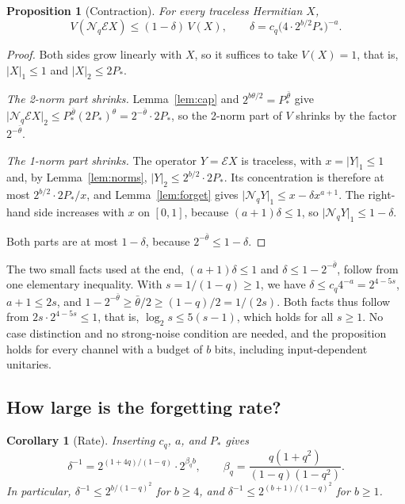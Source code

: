 \documentclass[aps,prl,twocolumn,superscriptaddress,floatfix]{revtex4-2}
\theoremstyle{plain}
\newtheorem{proposition}[lemma]{Proposition}
\newtheorem{corollary}[lemma]{Corollary}
\newcommand{\nrm}[2]{\lvert #1\rvert_{#2}}
\newcommand{\cE}{\mathcal E}
\newcommand{\Nq}{\mathcal N_q}
\begin{document}
\begin{proposition}[Contraction]\label{prop:contraction}
For every traceless Hermitian $X$,
\begin{equation}
V(\Nq\cE X)\le(1-\delta)\,V(X),\qquad\delta=c_q\bigl(4\cdot2^{b/2}P_*\bigr)^{-a}.
\label{eq:S-contraction}
\end{equation}
\end{proposition}

\begin{proof}
Both sides grow linearly with $X$, so it suffices to take $V(X)=1$, that is, $\nrm X1\le1$ and $\nrm X2\le2P_*$.

\emph{The 2-norm part shrinks.} Lemma~\ref{lem:cap} and $2^{b\theta/2}=P_*^{\,\bar\theta}$ give $\nrm{\Nq\cE X}2\le P_*^{\,\bar\theta}(2P_*)^{\theta}=2^{-\bar\theta}\cdot2P_*$, so the 2-norm part of $V$ shrinks by the factor $2^{-\bar\theta}$.

\emph{The 1-norm part shrinks.} The operator $Y=\cE X$ is traceless, with $x=\nrm Y1\le1$ and, by Lemma~\ref{lem:norms}, $\nrm Y2\le2^{b/2}\cdot2P_*$. Its concentration is therefore at most $2^{b/2}\cdot2P_*/x$, and Lemma~\ref{lem:forget} gives $\nrm{\Nq Y}1\le x-\delta x^{a+1}$. The right-hand side increases with $x$ on $[0,1]$, because $(a+1)\delta\le1$, so $\nrm{\Nq Y}1\le1-\delta$.

Both parts are at most $1-\delta$, because $2^{-\bar\theta}\le1-\delta$.
\end{proof}

The two small facts used at the end, $(a+1)\delta\le1$ and $\delta\le1-2^{-\bar\theta}$, follow from one elementary inequality. With $s=1/(1-q)\ge1$, we have $\delta\le c_q4^{-a}=2^{4-5s}$, $a+1\le2s$, and $1-2^{-\bar\theta}\ge\bar\theta/2\ge(1-q)/2=1/(2s)$. Both facts thus follow from $2s\cdot2^{4-5s}\le1$, that is, $\log_2s\le5(s-1)$, which holds for all $s\ge1$. No case distinction and no strong-noise condition are needed, and the proposition holds for every channel with a budget of $b$ bits, including input-dependent unitaries.

\subsection{How large is the forgetting rate?}
\label{sm:rate}

\begin{corollary}[Rate]\label{cor:rate}
Inserting $c_q$, $a$, and $P_*$ gives
\begin{equation}
\delta^{-1}=2^{(1+4q)/(1-q)}\cdot2^{\beta_qb},\qquad\beta_q=\frac{q(1+q^2)}{(1-q)(1-q^2)} .
\label{eq:S-rate}
\end{equation}
In particular, $\delta^{-1}\le2^{b/(1-q)^2}$ for $b\ge4$, and $\delta^{-1}\le2^{(b+1)/(1-q)^2}$ for $b\ge1$.
\end{corollary}
\end{document}
